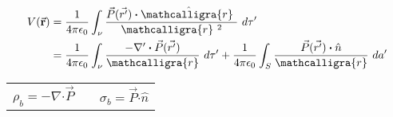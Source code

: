 \documentclass[12pt]{article}
\newcommand{\scripty}[1]{\ensuremath{\mathcalligra{#1}}}
\newcommand{\cursr}{\scripty{r}}		%
\newcommand{\cursrr}{\scripty{r}\ }
\newcommand{\dotP}{\boldsymbol \cdot}		%
\begin{document}
\begin{minipage}[t]{0.48\textwidth}
	\begin{align*}
		V(\vec{ \mathbf{r} }) &= \frac{1}{4 \pi \epsilon_0} 
			\int_\nu \frac{ \vec{P}( \vec{r'} ) \dotP \hat{ \cursrr } }{\cursrr^2} \ d\tau' \\
		&= \frac{1}{4 \pi \epsilon_0} \int_\nu \frac{ - \nabla' \dotP \vec{P}( \vec{r'} ) }{\cursr} \ d\tau' 
			+ \frac{1}{4 \pi \epsilon_0} \int_S \frac{ \vec{P}( \vec{r'} ) \dotP \hat{n} }{\cursr} \ da'
	\end{align*}
	\begin{center}
		\begin{tabular}{c m{.1cm} c}
			\( \boxed{ \rho_b = - \nabla \dotP \vec{P} } \) 
			& &
			\( \boxed{ \sigma_b = \vec{P} \dotP \hat{n} } \)
		\end{tabular}
	\end{center}

\end{minipage}
\hfill\vline\hfill
\end{document}
